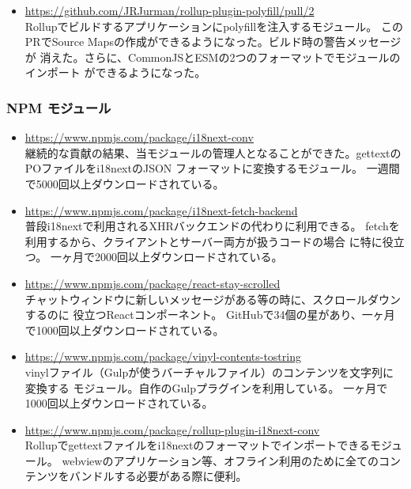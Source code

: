 \documentclass{res}
\begin{document}
\begin{resume}
\begin{itemize}
  \item \url{https://github.com/JRJurman/rollup-plugin-polyfill/pull/2} \\
  Rollupでビルドするアプリケーションにpolyfillを注入するモジュール。
  このPRでSource Mapsの作成ができるようになった。ビルド時の警告メッセージが
  消えた。さらに、CommonJSとESMの2つのフォーマットでモジュールのインポート
  ができるようになった。
\end{itemize}

\subsubsection{NPM モジュール}

\begin{itemize}
  \item \url{https://www.npmjs.com/package/i18next-conv} \\
  継続的な貢献の結果、当モジュールの管理人となることができた。gettextのPOファイルをi18nextのJSON
  フォーマットに変換するモジュール。
  一週間で5000回以上ダウンロードされている。

  \item \url{https://www.npmjs.com/package/i18next-fetch-backend} \\
  普段i18nextで利用されるXHRバックエンドの代わりに利用できる。
  fetchを利用するから、クライアントとサーバー両方が扱うコードの場合
  に特に役立つ。
  一ヶ月で2000回以上ダウンロードされている。

  \item \url{https://www.npmjs.com/package/react-stay-scrolled} \\
  チャットウィンドウに新しいメッセージがある等の時に、スクロールダウンするのに
  役立つReactコンポーネント。
  GitHubで34個の星があり、一ヶ月で1000回以上ダウンロードされている。

  \item \url{https://www.npmjs.com/package/vinyl-contents-tostring} \\
  vinylファイル（Gulpが使うバーチャルファイル）のコンテンツを文字列に変換する
  モジュール。自作のGulpプラグインを利用している。
  一ヶ月で1000回以上ダウンロードされている。

  \item \url{https://www.npmjs.com/package/rollup-plugin-i18next-conv} \\
  Rollupでgettextファイルをi18nextのフォーマットでインポートできるモジュール。
  webviewのアプリケーション等、オフライン利用のために全てのコンテンツをバンドルする必要がある際に便利。


\end{itemize}
\end{resume}
\end{document}
